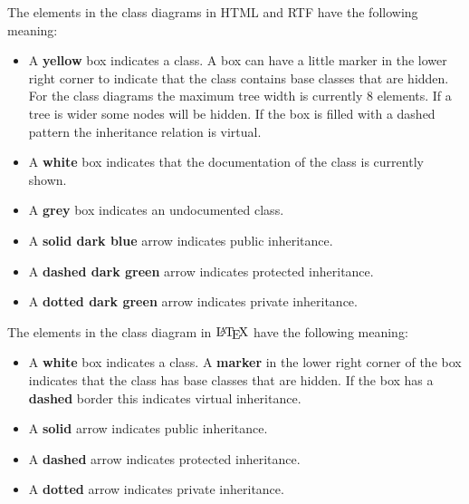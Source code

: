 The elements in the class diagrams in HTML and RTF have the following meaning: \begin{itemize}
\item A {\bf yellow} box indicates a class. A box can have a little marker in the lower right corner to indicate that the class contains base classes that are hidden. For the class diagrams the maximum tree width is currently 8 elements. If a tree is wider some nodes will be hidden. If the box is filled with a dashed pattern the inheritance relation is virtual. \item A {\bf white} box indicates that the documentation of the class is currently shown. \item A {\bf grey} box indicates an undocumented class. \item A {\bf solid dark blue} arrow indicates public inheritance. \item A {\bf dashed dark green} arrow indicates protected inheritance. \item A {\bf dotted dark green} arrow indicates private inheritance. \end{itemize}


The elements in the class diagram in $\mbox{\LaTeX}$ have the following meaning: \begin{itemize}
\item A {\bf white} box indicates a class. A {\bf marker} in the lower right corner of the box indicates that the class has base classes that are hidden. If the box has a {\bf dashed} border this indicates virtual inheritance. \item A {\bf solid} arrow indicates public inheritance. \item A {\bf dashed} arrow indicates protected inheritance. \item A {\bf dotted} arrow indicates private inheritance. \end{itemize}



